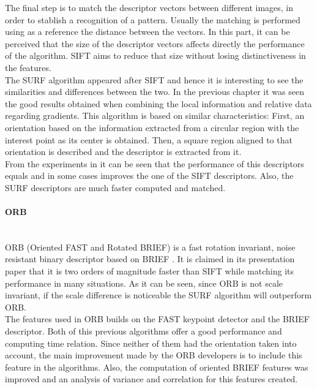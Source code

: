 The final step is to match the descriptor vectors between different images, in order to stablish a recognition of a pattern. Usually the matching is performed using as a reference the distance between the vectors. 
In this part, it can be perceived that the size of the descriptor vectors affects directly the performance of the algorithm. SIFT aims to reduce that size without losing distinctiveness in the features. 
\\

The SURF algorithm appeared after SIFT and hence it is interesting to see the similarities and differences between the two. In the previous chapter it was seen the good results obtained when combining the local information and relative data regarding gradients. This algorithm is based on similar characteristics: 
First, an orientation based on the information extracted from a circular region with the interest point as its center is obtained. Then, a square region aligned to that orientation is described and the descriptor is extracted from it.  
\\

From the experiments in \cite{surf} it can be seen that the performance of this descriptors equals and in some cases improves the one of the SIFT descriptors. Also, the SURF descriptors are much faster computed and matched. 


\paragraph{ORB}\mbox{}\\

ORB (Oriented FAST and Rotated BRIEF) is a fast rotation invariant, noise resistant binary descriptor based on BRIEF \cite{orb}.
It is claimed in its presentation paper that it is two orders of magnitude faster than SIFT while matching its performance in many situations. As it can be seen, since ORB is not scale invariant, if the scale difference is noticeable the SURF algorithm will outperform ORB. 
\\

The features used in ORB builds on the FAST\cite{fast} keypoint detector and the BRIEF\cite{brief} descriptor. Both of this previous algorithms offer a good performance and computing time relation. Since neither of them had the orientation taken into account, the main improvement made by the ORB developers is to include this feature in the algorithms. Also, the computation of oriented BRIEF features was improved and an analysis of variance and correlation for this features created. 
\\

